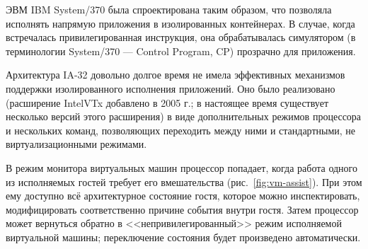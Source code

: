 ЭВМ IBM System/370 была спроектирована таким образом, что позволяла исполнять напрямую приложения в изолированных контейнерах. В случае, когда встречалась привилегированная инструкция, она обрабатывалась симулятором (в терминологии System/370 --- Control Program, CP) прозрачно для приложения.

Архитектура IA-32 довольно долгое время не имела эффективных механизмов поддержки изолированного исполнения приложений. Оно было реализовано (расширение Intel\textregistered VTx добавлено в 2005 г.; в настоящее время существует несколько версий этого расширения) в виде дополнительных режимов процессора и нескольких команд, позволяющих переходить между ними и стандартными, не виртуализационными режимами.

В режим монитора виртуальных машин процессор попадает, когда работа одного из исполняемых гостей требует его вмешательства (рис.~\ref{fig:vm-assist}). При этом ему доступно всё архитектурное состояние гостя, которое можно инспектировать, модифицировать соответственно причине события внутри гостя. Затем процессор может вернуться обратно в <<непривилегированный>> режим исполняемой виртуальной машины; переключение состояния будет произведено автоматически.

